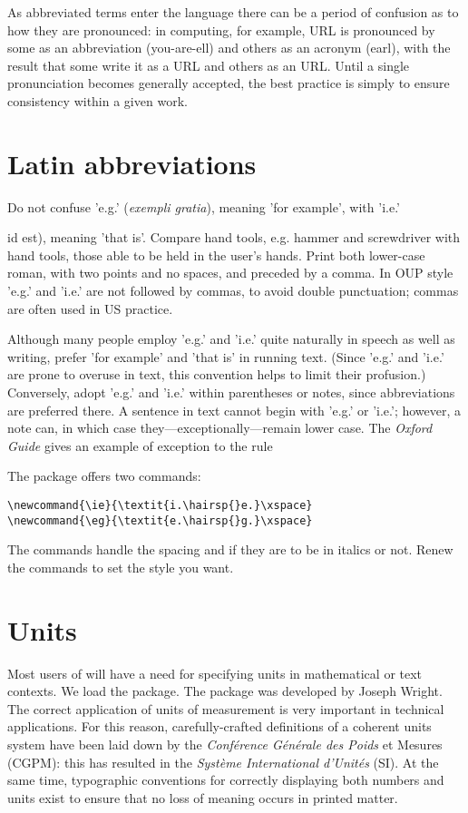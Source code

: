 As abbreviated terms enter the
language there can be a period of confusion as to how they are pronounced:
in computing, for example, \ac{URL} is
pronounced by some as an abbreviation (you-are-ell) and others as an
acronym (earl), with the result that some write it as a URL and others as
an URL. Until a single pronunciation becomes generally accepted, the
best practice is simply to ensure consistency within a given work.

\section{Latin abbreviations}
\normalfont

Do not confuse 'e.g.' (\emph{exempli gratia}), meaning 'for example', with 'i.e.'
{id est), meaning 'that is'. Compare hand tools, e.g. hammer and screwdriver
with hand tools, \ie those able to be held in the user's hands. Print both lower-case roman, with two points and no spaces, and preceded by a
comma. In OUP style 'e.g.' and 'i.e.' are not followed by commas, to avoid
double punctuation; commas are often used in US practice.

Although many people employ 'e.g.' and 'i.e.' quite naturally in speech
as well as writing, prefer 'for example' and 'that is' in running text.
(Since 'e.g.' and 'i.e.' are prone to overuse in text, this convention helps
to limit their profusion.) Conversely, adopt 'e.g.' and 'i.e.' within parentheses
or notes, since abbreviations are preferred there. A sentence in text cannot begin with 'e.g.' or 'i.e.'; however, a note can, in which case
they—exceptionally—remain lower case. The \textit{Oxford Guide} gives an example of exception to the rule

The package offers two commands:

\begin{verbatim}
\newcommand{\ie}{\textit{i.\hairsp{}e.}\xspace}
\newcommand{\eg}{\textit{e.\hairsp{}g.}\xspace}
\end{verbatim}

The commands handle the spacing and if they are to be in italics or not. Renew the commands to set the style you want.

\section{Units}
\label{units}

Most users of \latex will have a need for specifying units in  mathematical or text contexts. We load the  package. The package was developed by Joseph Wright\cite{siunitx}. The correct application of units of measurement is very important in technical applications. For this reason, carefully-crafted definitions of a coherent units system have been
laid down by the \textit{Conférence Générale des Poids} et Mesures (CGPM): this has resulted in
the \textit{Système International d’Unités} (SI). At the same time, typographic conventions for
correctly displaying both numbers and units exist to ensure that no loss of meaning
occurs in printed matter.

}
